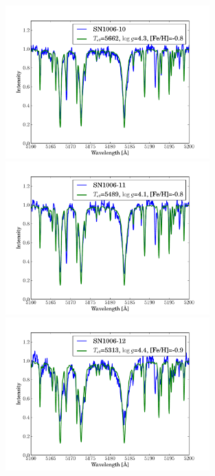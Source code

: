 \begin{figure}[htbp]
   \label{fig:sn1006_candfit}
\end{figure}\begin{figure}[htbp] %
   \centering
\includegraphics[width=0.7\textwidth, trim=0 0mm 0 10mm, clip]{chapter_sn1006/plots/gold_spectra/sn1006_10.pdf}
\includegraphics[width=0.7\textwidth, trim=0 0mm 0 10mm, clip]{chapter_sn1006/plots/gold_spectra/sn1006_11.pdf}
\includegraphics[width=0.7\textwidth, trim=0 0mm 0 10mm, clip]{chapter_sn1006/plots/gold_spectra/sn1006_12.pdf}


\end{figure}
